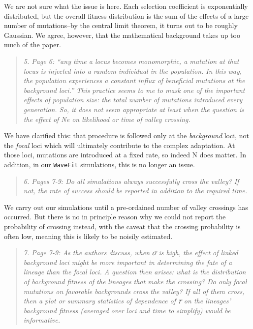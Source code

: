 \documentclass[11pt]{article}
\newenvironment{reviewerquote}{\begin{quote}\color{black}\itshape}{\end{quote}}
\begin{document}
We are not sure what the issue is here. Each selection coefficient is exponentially distributed, but the overall fitness distribution is the sum of the effects of a large number of mutations--by the central limit theorem, it turns out to be roughly Gaussian. We agree, however, that the mathematical background takes up too much of the paper.

\begin{reviewerquote}
5. Page 6: “any time a locus becomes monomorphic, a mutation at that locus is injected into a random individual in the population. In this way, the population experiences a constant influx of beneficial mutations at the background loci.” This practice seems to me to mask one of the important effects of population size: the total number of mutations introduced every generation. So, it does not seem appropriate at least when the question is the effect of Ne on likelihood or time of valley crossing.
\end{reviewerquote}

We have clarified this: that procedure is followed only at the \emph{background} loci, not the \emph{focal} loci which will ultimately contribute to the complex adaptation. At those loci, mutations are introduced at a fixed rate, so indeed N does matter. In addition, in our \texttt{WaveFit} simulations, this is no longer an issue.

\begin{reviewerquote}
6. Pages 7-9: Do all simulations always successfully cross the valley? If not, the rate of success should be reported in addition to the required time.
\end{reviewerquote}

We carry out our simulations until a pre-ordained number of valley crossings has occurred. But there is no in principle reason why we could not report the probability of crossing instead, with the caveat that the crossing probability is often low, meaning this is likely to be noisily estimated.

\begin{reviewerquote}
7. Page 7-9: As the authors discuss, when 𝜎 is high, the effect of linked background loci might be more important in determining the fate of a lineage than the focal loci. A question then arises: what is the distribution of background fitness of the lineages that make the crossing? Do only focal mutations on favorable backgrounds cross the valley? If all of them cross, then a plot or summary statistics of dependence of 𝜏 on the lineages’ background fitness (averaged over loci and time to simplify) would be informative.
\end{reviewerquote}
\end{document}
